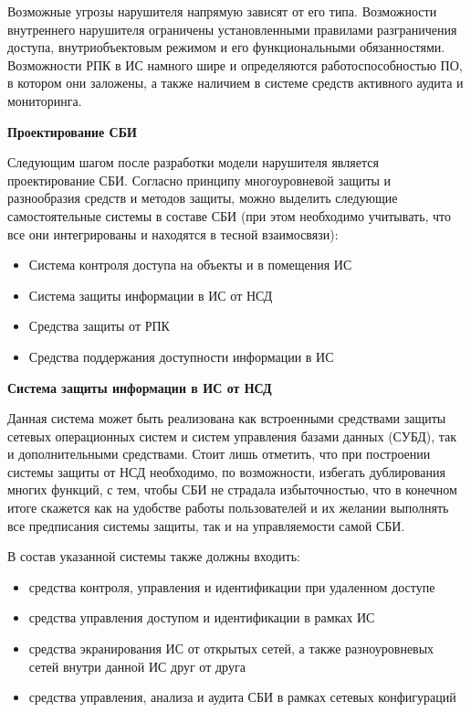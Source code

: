 Возможные угрозы нарушителя напрямую зависят от его типа. Возможности внутреннего нарушителя ограничены
установленными правилами разграничения доступа, внутриобъектовым режимом и его функциональными обязанностями.
Возможности РПК в ИС намного шире и определяются работоспособностью ПО, в котором они заложены,
а также наличием в системе средств активного аудита и мониторинга.

\bigbreak
\textbf{Проектирование СБИ}

Следующим шагом после разработки модели нарушителя является проектирование СБИ.
Согласно принципу многоуровневой защиты и разнообразия средств и методов защиты, можно выделить следующие
самостоятельные системы в составе СБИ (при этом необходимо учитывать, что все они интегрированы
и находятся в тесной взаимосвязи):
\begin{itemize}
    \item Система контроля доступа на объекты и в помещения ИС
    \item Система защиты информации в ИС от НСД
    \item Средства защиты от РПК
    \item Средства поддержания доступности информации в ИС
\end{itemize}

\bigbreak
\textbf{Система защиты информации в ИС от НСД}

Данная система может быть реализована как встроенными средствами защиты сетевых операционных
систем и систем управления базами данных (СУБД), так и дополнительными средствами. Стоит лишь отметить,
что при построении системы защиты от НСД необходимо, по возможности, избегать дублирования многих функций,
с тем, чтобы СБИ не страдала избыточностью, что в конечном итоге скажется как на удобстве работы
пользователей и их желании выполнять все предписания системы защиты, так и на управляемости самой СБИ.

В состав указанной системы также должны входить:
\begin{itemize}
    \item средства контроля, управления и идентификации при удаленном доступе
    \item средства управления доступом и идентификации в рамках ИС
    \item средства экранирования ИС от открытых сетей, а также разноуровневых сетей внутри данной ИС друг от друга
    \item средства управления, анализа и аудита СБИ в рамках сетевых конфигураций
\end{itemize}

